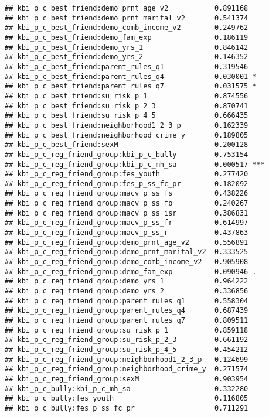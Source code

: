 \documentclass[
]{article}
\begin{document}
\begin{verbatim}
## kbi_p_c_best_friend:demo_prnt_age_v2           0.891168    
## kbi_p_c_best_friend:demo_prnt_marital_v2       0.541374    
## kbi_p_c_best_friend:demo_comb_income_v2        0.249762    
## kbi_p_c_best_friend:demo_fam_exp               0.186119    
## kbi_p_c_best_friend:demo_yrs_1                 0.846142    
## kbi_p_c_best_friend:demo_yrs_2                 0.146352    
## kbi_p_c_best_friend:parent_rules_q1            0.319546    
## kbi_p_c_best_friend:parent_rules_q4            0.030001 *  
## kbi_p_c_best_friend:parent_rules_q7            0.031575 *  
## kbi_p_c_best_friend:su_risk_p_1                0.874556    
## kbi_p_c_best_friend:su_risk_p_2_3              0.870741    
## kbi_p_c_best_friend:su_risk_p_4_5              0.666435    
## kbi_p_c_best_friend:neighborhood1_2_3_p        0.162339    
## kbi_p_c_best_friend:neighborhood_crime_y       0.189805    
## kbi_p_c_best_friend:sexM                       0.200128    
## kbi_p_c_reg_friend_group:kbi_p_c_bully         0.753154    
## kbi_p_c_reg_friend_group:kbi_p_c_mh_sa         0.000517 ***
## kbi_p_c_reg_friend_group:fes_youth             0.277420    
## kbi_p_c_reg_friend_group:fes_p_ss_fc_pr        0.182092    
## kbi_p_c_reg_friend_group:macv_p_ss_fs          0.438226    
## kbi_p_c_reg_friend_group:macv_p_ss_fo          0.240267    
## kbi_p_c_reg_friend_group:macv_p_ss_isr         0.386831    
## kbi_p_c_reg_friend_group:macv_p_ss_fr          0.614997    
## kbi_p_c_reg_friend_group:macv_p_ss_r           0.437863    
## kbi_p_c_reg_friend_group:demo_prnt_age_v2      0.556891    
## kbi_p_c_reg_friend_group:demo_prnt_marital_v2  0.333525    
## kbi_p_c_reg_friend_group:demo_comb_income_v2   0.905908    
## kbi_p_c_reg_friend_group:demo_fam_exp          0.090946 .  
## kbi_p_c_reg_friend_group:demo_yrs_1            0.964222    
## kbi_p_c_reg_friend_group:demo_yrs_2            0.336856    
## kbi_p_c_reg_friend_group:parent_rules_q1       0.558304    
## kbi_p_c_reg_friend_group:parent_rules_q4       0.687439    
## kbi_p_c_reg_friend_group:parent_rules_q7       0.809511    
## kbi_p_c_reg_friend_group:su_risk_p_1           0.859118    
## kbi_p_c_reg_friend_group:su_risk_p_2_3         0.661192    
## kbi_p_c_reg_friend_group:su_risk_p_4_5         0.454212    
## kbi_p_c_reg_friend_group:neighborhood1_2_3_p   0.124699    
## kbi_p_c_reg_friend_group:neighborhood_crime_y  0.271574    
## kbi_p_c_reg_friend_group:sexM                  0.903954    
## kbi_p_c_bully:kbi_p_c_mh_sa                    0.332280    
## kbi_p_c_bully:fes_youth                        0.116805    
## kbi_p_c_bully:fes_p_ss_fc_pr                   0.711291    

\end{verbatim}
\end{document}
